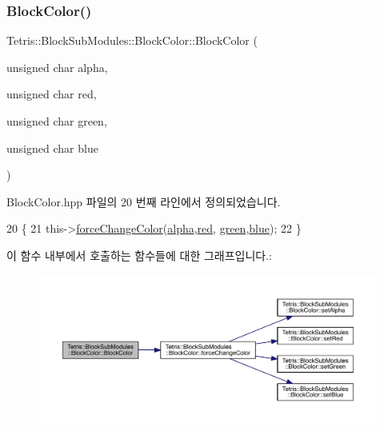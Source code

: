 \subsubsection{\texorpdfstring{Block\+Color()}{BlockColor()}\hspace{0.1cm}{\footnotesize\ttfamily [1/2]}}
{\footnotesize\ttfamily Tetris\+::\+Block\+Sub\+Modules\+::\+Block\+Color\+::\+Block\+Color (\begin{DoxyParamCaption}\item[{unsigned char}]{alpha,  }\item[{unsigned char}]{red,  }\item[{unsigned char}]{green,  }\item[{unsigned char}]{blue }\end{DoxyParamCaption})\hspace{0.3cm}{\ttfamily [inline]}}



Block\+Color.\+hpp 파일의 20 번째 라인에서 정의되었습니다.


\begin{DoxyCode}
20                                                                                                            
         \{
21                     this->\hyperlink{class_tetris_1_1_block_sub_modules_1_1_block_color_ae6d640629b11d880ca994923657adbe1}{forceChangeColor}(\hyperlink{class_tetris_1_1_block_sub_modules_1_1_block_color_af0983ea684f33617a0b482cfea1d3c2b}{alpha},\hyperlink{class_tetris_1_1_block_sub_modules_1_1_block_color_af8a0dc372e7dbab300290eadada8ef49}{red},
      \hyperlink{class_tetris_1_1_block_sub_modules_1_1_block_color_a4b28885bfd8bf53793c6b3daedd974eb}{green},\hyperlink{class_tetris_1_1_block_sub_modules_1_1_block_color_af04e78b9a1c2f7625863c289c4a741e3}{blue});
22                 \}
\end{DoxyCode}
이 함수 내부에서 호출하는 함수들에 대한 그래프입니다.\+:
\nopagebreak
\begin{figure}[H]
\begin{center}
\leavevmode
\includegraphics[width=350pt]{de/d44/class_tetris_1_1_block_sub_modules_1_1_block_color_abb929df07c6b378e31d76b7298eb9e12_cgraph}
\end{center}
\end{figure}
\mbox{\label{class_tetris_1_1_block_sub_modules_1_1_block_color_aba62c9da4cb4b43caa871452a34790a9}} 

